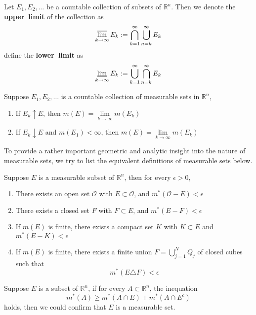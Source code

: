 \documentclass{ctexbook}
\begin{document}
\begin{define}
    Let $E_1, E_2,\ldots$ be a countable collection of subsets of $\mathbb{R}^n$. Then we denote the \textbf{upper~limit} of the
    collection as \[\varlimsup \limits_{k \rightarrow \infty} E_k := \bigcap\limits_{k=1}^\infty\bigcup\limits_{n=k}^\infty E_k \]
    define the \textbf{lower~limit} as
    \[\varliminf \limits_{k \rightarrow \infty} E_k := \bigcup\limits_{k=1}^\infty\bigcap\limits_{n=k}^\infty E_k \]
\end{define}

\begin{cor}
    Suppose $E_1,E_2,\ldots$ is a countable collection of measurable sets in $\mathbb{R}^n$,
    \begin{enumerate}
        \item If $E_k \uparrow E$, then $m(E)=\lim\limits_{k \rightarrow \infty} m(E_k)$
        \item If $E_k \downarrow E$ and $m(E_1)<\infty$, then $m(E) = \lim\limits_{k \rightarrow \infty} m(E_k)$
    \end{enumerate}
\end{cor}

To provide a rather important geometric and analytic insight into the nature of measurable sets, we try to list the
equivalent definitions of measurable sets below.
\begin{thm}
    Suppose $E$ is a measurable subset of $\mathbb{R}^n$, then for every $\epsilon>0$,
    \begin{enumerate}
        \item There exists an open set $\mathcal{O}$ with $E \subset \mathcal{O}$, and $m^*(\mathcal{O} - E) < \epsilon$
        \item There exists a closed set $F$ with $F \subset E$, and $m^*(E-F)<\epsilon$
        \item If $m(E)$ is finite, there exists a compact set $K$ with $K \subset E$ and $m^*(E-K) < \epsilon$
        \item If $m(E)$ is finite, there exists a finite union $F=\bigcup\limits_{j=1}^N Q_j$ of closed cubes such that \[m^*(E\triangle F)<\epsilon\]
    \end{enumerate}
\end{thm}
\begin{thm}
    Suppose $E$ is a subset of $\mathbb{R}^n$, if for every $A\subset \mathbb{R}^n$, the inequation
    \[m^*(A) \geq m^*(A\cap E)+m^*(A\cap E^c)\]
    holds, then we could confirm that $E$ is a measurable set.
\end{thm}
\end{document}
